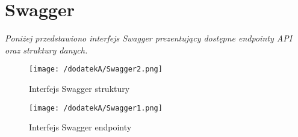 %
\thispagestyle{empty}
\listoffigures

\chapter{Swagger}
\label{chapter:dodatek_A}

\textit{Poniżej przedstawiono interfejs Swagger prezentujący dostępne endpointy API oraz struktury danych.}

\begin{figure}[!htb]
	\centering
	\texttt{[image: /dodatekA/Swagger2.png]}
	\caption{Interfejs Swagger struktury}
	\label{fig:swagger2}
\end{figure}

\begin{figure}[!htb]
	\centering
	\texttt{[image: /dodatekA/Swagger1.png]}
	\caption{Interfejs Swagger endpointy}
	\label{fig:swagger1}
\end{figure}